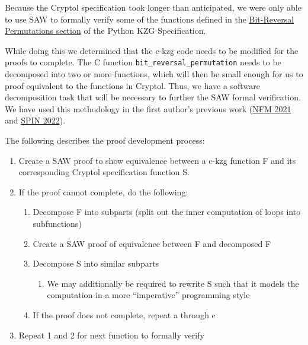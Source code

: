 \documentclass[12pt]{galois-whitepaper}
\begin{document}
Because the Cryptol specification took longer than anticipated, we were only able to use SAW to formally verify
some of the functions defined in the \href{https://github.com/ethereum/consensus-specs/blob/68d32accf945a84f69d4c779cb6c71223a311eac/specs/deneb/polynomial-commitments.md\#bit-reversal-permutation}{Bit-Reversal Permutations section}
of the Python KZG Specification.

While doing this we determined that the c-kzg code needs to be modified for the proofs to complete.
The C function \texttt{bit\_reversal\_permutation} needs to be decomposed into two or more functions,
which will then be small enough for us to proof equivalent to the functions in Cryptol. Thus, we have
a software decomposition task that will be necessary to further the SAW formal verification. We have used this
methodology in the first author's previous work (\href{https://link.springer.com/chapter/10.1007/978-3-030-76384-8_5}{NFM 2021} and
\href{https://link.springer.com/chapter/10.1007/978-3-031-15077-7_6}{SPIN 2022}).

The following describes the proof development process:
\begin{enumerate}
    \item Create a SAW proof to show equivalence between a c-kzg function F and its corresponding Cryptol specification function S.
    \item If the proof cannot complete, do the following:
          \begin{enumerate}
                \item Decompose F into subparts (split out the inner computation of loops into subfunctions)
                \item Create a SAW proof of equivalence between F and decomposed F
                \item Decompose S into similar subparts
                      \begin{enumerate}
                        \item We may additionally be required to rewrite S such that it models the computation in a more “imperative” programming style
                      \end{enumerate}
                \item If the proof does not complete, repeat a through c
          \end{enumerate}
    \item Repeat 1 and 2 for next function to formally verify
\end{enumerate}
\end{document}
